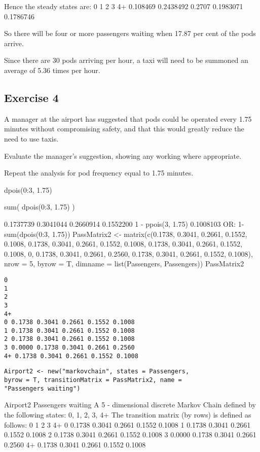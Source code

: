 \documentclass[a4paper,12pt]{article}
\begin{document}
Hence the steady states are:
0
1
2
3
4+
0.108469 0.2438492 0.2707 0.1983071 0.1786746



So there will be four or more passengers waiting when 17.87 per cent of the pods arrive.

Since there are 30 pods arriving per hour, a taxi will need to be summoned an average of 5.36 times per hour.


\newpage 
\subsection*{Exercise 4}

A manager at the airport has suggested that pods could be operated every 1.75 minutes without compromising safety, and that this would greatly reduce the
need to use taxis.

Evaluate the manager’s suggestion, showing any working where appropriate.


Repeat the analysis for pod frequency equal to 1.75 minutes.

dpois(0:3, 1.75) %

sum( dpois(0:3, 1.75) )




 0.1737739 0.3041044 0.2660914 0.1552200
1 - ppois(3, 1.75)
 0.1008103
OR:
1-sum(dpois(0:3, 1.75))
PassMatrix2 <- matrix(c(0.1738, 0.3041, 0.2661, 0.1552,
0.1008, 0.1738, 0.3041, 0.2661, 0.1552, 0.1008, 0.1738,
0.3041, 0.2661, 0.1552, 0.1008, 0, 0.1738, 0.3041,
0.2661, 0.2560, 0.1738, 0.3041, 0.2661, 0.1552, 0.1008),
nrow = 5, byrow = T, dimname = list(Passengers,
Passengers))
PassMatrix2


\begin{framed}
\begin{verbatim}
0
1
2
3
4+
0 0.1738 0.3041 0.2661 0.1552 0.1008
1 0.1738 0.3041 0.2661 0.1552 0.1008
2 0.1738 0.3041 0.2661 0.1552 0.1008
3 0.0000 0.1738 0.3041 0.2661 0.2560
4+ 0.1738 0.3041 0.2661 0.1552 0.1008
\end{verbatim}
\end{framed}

\begin{framed}
\begin{verbatim}
Airport2 <- new("markovchain", states = Passengers,
byrow = T, transitionMatrix = PassMatrix2, name =
"Passengers waiting")    
\end{verbatim}
\end{framed}

Airport2
Passengers waiting
A 5 - dimensional discrete Markov Chain defined by the
following states:
0, 1, 2, 3, 4+
The transition matrix (by rows) is defined as follows:
0
1
2
3
4+
0 0.1738 0.3041 0.2661 0.1552 0.1008
1 0.1738 0.3041 0.2661 0.1552 0.1008
2 0.1738 0.3041 0.2661 0.1552 0.1008
3 0.0000 0.1738 0.3041 0.2661 0.2560
4+ 0.1738 0.3041 0.2661 0.1552 0.1008
\end{document}

